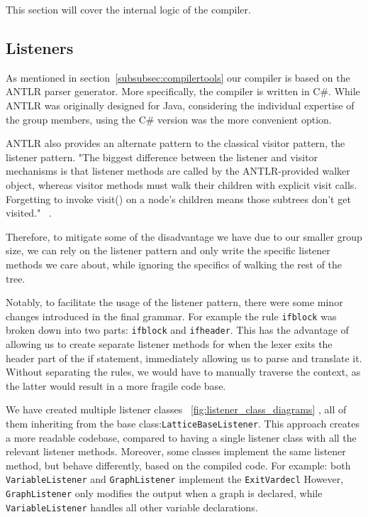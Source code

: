 This section will cover the internal logic of the compiler.

\subsection{Listeners}
As mentioned in section~\ref{subsubsec:compilertools} our compiler is based on the ANTLR parser generator.
More specifically, the compiler is written in C\#.
While ANTLR was originally designed for Java, considering the individual expertise of the group members,
using the C\# version was the more convenient option.

ANTLR also provides an alternate pattern to the classical visitor pattern, the listener pattern.
"The biggest difference between the listener and visitor mechanisms is that
listener methods are called by the ANTLR-provided walker object, whereas
visitor methods must walk their children with explicit visit calls. Forgetting
to invoke visit() on a node’s children means those subtrees don’t get visited." ~\cite{ANTLRReference}.

Therefore, to mitigate some of the disadvantage we have due to our smaller group size, we can rely on the listener pattern
and only write the specific listener methods we care about, while ignoring the specifics of walking the rest of the tree.

Notably, to facilitate the usage of the listener pattern, there were some minor changes introduced in the final grammar.
For example the rule \lstinline{ifblock} was broken down into two parts: \lstinline{ifblock} and \lstinline{ifheader}.
This has the advantage of allowing us to create separate listener methods for when the lexer exits
the header part of the if statement, immediately allowing us to parse and translate it.
Without separating the rules, we would have to manually traverse the context, as the latter would result in a
more fragile code base.

We have created multiple listener classes ~\ref{fig:listener_class_diagrams} , all of them inheriting from the base class:\lstinline{LatticeBaseListener}.
This approach creates a more readable codebase, compared to having a single listener class with all the relevant
listener methods.
Moreover, some classes implement the same listener method, but behave differently, based on the compiled code.
For example: both \lstinline{VariableListener} and \lstinline{GraphListener} implement the \lstinline{ExitVardecl}
However, \lstinline{GraphListener} only modifies the output when a graph is declared, while \lstinline{VariableListener}
handles all other variable declarations.

